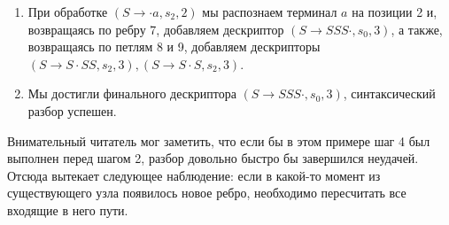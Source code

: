 \begin{example}
\begin{enumerate}
\begin{center}
    \end{center}
    
    \item При обработке $ (S \to \cdot a, s_2, 2) $ мы распознаем терминал $a$ на позиции 2 и, возвращаясь по ребру 7, добавляем дескриптор $ (S \to S S S \cdot, s_0, 3) $, а также, возвращаясь по петлям 8 и 9, добавляем дескрипторы $ (S \to S \cdot S S, s_2, 3), (S \to S \cdot S, s_2, 3) $.
    
    \item Мы достигли финального дескриптора $ (S \to S S S \cdot, s_0, 3) $, синтаксический разбор успешен.
  \end{enumerate}

\end{example}

Внимательный читатель мог заметить, что если бы в этом примере шаг 4 был выполнен перед шагом 2, разбор довольно быстро бы завершился неудачей. Отсюда вытекает следующее наблюдение: если в какой-то момент из существующего узла появилось новое ребро, необходимо пересчитать все входящие в него пути. 


